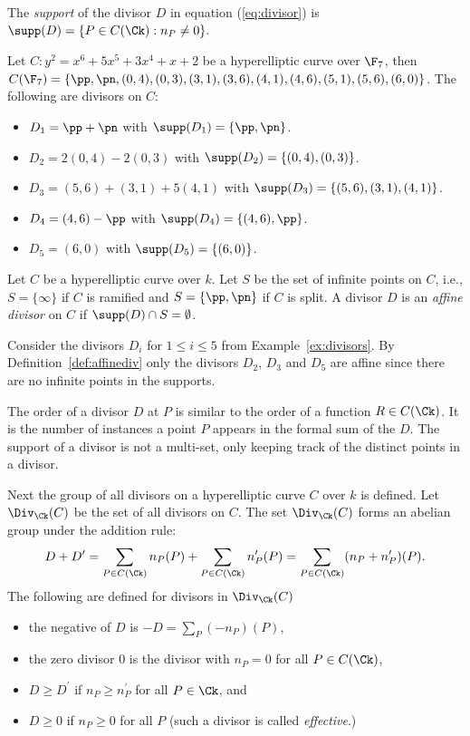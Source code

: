 \bd\label{def:support}
\cite[Adapted from Definition~7.6.1]{Galbraith_PKC_2012} The \emph{support} of
the divisor $D$ in equation (\ref{eq:divisor}) is $ \supp(D) = \{ P \in C(\Ck) :
n_P \neq 0 \}.$
\ed

\be\label{ex:divisors} 
Let $C : y^2 = x^6 + 5x^5 + 3x^4 + x + 2$ be a hyperelliptic curve over
$\F_{7}$, then  $C(\F_{7}) = \{\pp, \pn, (0,4), (0,3), (3,1), (3,6), (4,1),
(4,6), (5,1), (5,6), (6,0)\}$. The following are divisors on $C$:
\begin{itemize}
  \item $D_1 = \pp + \pn$ with $\supp(D_1) = \{\pp,\pn\}$.
  \item $D_2 = 2(0,4) - 2(0,3)$ with $\supp(D_2) = \{(0,4),(0,3)\}$.
  \item $D_3 = (5,6) + (3,1) + 5(4,1)$ with $\supp(D_3) = \{(5,6),(3,1),(4,1)\}$.
  \item $D_4 = (4,6) - \pp$ with $\supp(D_4) = \{(4,6), \pp\}$.
  \item $D_5 = (6,0)$ with $\supp(D_5) = \{(6,0)\}$.
\end{itemize}
\ee

\bd\label{def:affinediv}
\cite[Adapted from Definition~10.3.1]{Galbraith_PKC_2012} Let $C$ be a
hyperelliptic curve over $k$. Let $S$ be the set of infinite points on $C$,
i.e., $S = \{\infty \}$ if $C$ is ramified and $S = \{\pp, \pn\}$ if
$C$ is split. A divisor $D$ is an \emph{affine divisor} on $C$ if $\supp(D) \cap
S = \emptyset$.
\ed

\be
Consider the divisors $D_i$ for $ 1\leq i \leq 5$ from Example~\ref{ex:divisors}. By
Definition~\ref{def:affinediv} only the divisors $D_2$, $D_3$ and $D_5$ are
affine since there are no infinite points in the supports.
\ee

The order of a divisor $D$ at $P$ is similar to the order of a function $R \in
C(\Ck)$. It is the number of instances a point $P$ appears in the formal sum of
the $D$. The support of a divisor is not a multi-set, only keeping track of the
distinct points in a divisor.

Next the group of all divisors on a hyperelliptic curve $C$ over $k$ is defined.
\bd\label{def:effectivediv}
\cite[Adapted from Definition~7.6.1]{Galbraith_PKC_2012} Let $\Div_{\Ck}(C)$ be
the set of all divisors on $C$. The set $\Div_{\Ck}(C)$ forms an abelian group
under the addition rule: $$ D + D^{\prime} = \sum_{P \in C(\Ck)} n_P(P) +
\sum_{P \in C(\Ck)} n^{\prime}_P(P) =  \sum_{P \in C(\Ck)}
(n_P + n^{\prime}_P)(P).$$ The following are defined for divisors in $\Div_{\Ck}(C)$
\begin{itemize}
  \item the negative of $D$ is $-D = \sum_{P} (-n_P)(P),$
  \item the zero divisor $0$ is the divisor with $n_P = 0$ for all $P \in C(\Ck)$,
  \item $D \geq D^{\prime}$ if $n_P \geq n^{\prime}_P$ for all $P \in \Ck$, and
  \item $D \geq 0$ if $n_P \geq 0$ for all $P$ (such a divisor is called
  \emph{effective}.)
  \end{itemize}    
\ed

